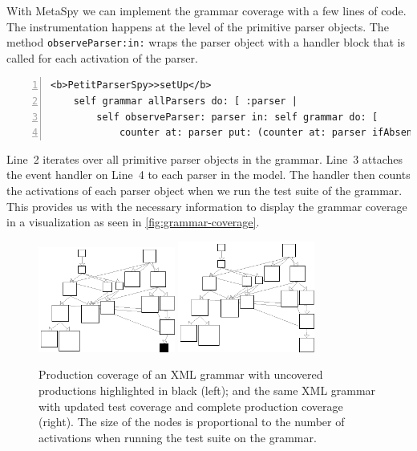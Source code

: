 \documentclass[runningheads]{llncs}
\newcommand{\project}{{\sc MetaSpy}\xspace}
\newcommand{\ct}{\lstinline[backgroundcolor=\color{white},basicstyle=\footnotesize\ttfamily]}
\begin{document}
With \project we can implement the grammar coverage with a few lines of code. The instrumentation happens at the level of the primitive parser objects. The method \ct{observeParser:in:} wraps the parser object with a handler block that is called for each activation of the parser.

\begin{lstlisting}[numbers=left]
<b>PetitParserSpy>>setUp</b>
	self grammar allParsers do: [ :parser |
		self observeParser: parser in: self grammar do: [
			counter at: parser put: (counter at: parser ifAbsent: [ 0 ]) + 1 ] ]
\end{lstlisting}

Line~2 iterates over all primitive parser objects in the grammar. Line~3 attaches the event handler on Line~4 to each parser in the model. The handler then counts the activations of each parser object when we run the test suite of the grammar. This provides us with the necessary information to display the grammar coverage in a visualization as seen in \autoref{fig:grammar-coverage}.

\begin{figure}[h!tb]
	\centering
	\includegraphics[width=0.4\textwidth]{xml-uncovered}
	\hspace{0.1\textwidth}
	\includegraphics[width=0.4\textwidth]{xml-covered}
	\caption{Production coverage of an XML grammar with uncovered productions highlighted in black (left); and the same XML grammar with updated test coverage and complete production coverage (right). The size of the nodes is proportional to the number of activations when running the test suite on the grammar.}
	\label{fig:grammar-coverage}
\end{figure}
\end{document}
